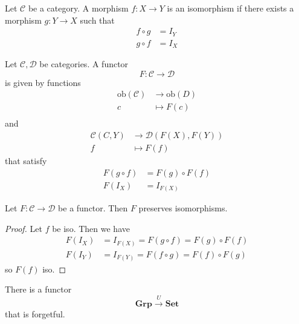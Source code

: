 \begin{definition}[isomorphism]
   Let \( \mathcal{C} \) be a category.
   A morphism \( f: X \to Y \) is an isomorphism
   if there exists a morphism \( g: Y \to  X \) such that
   \begin{align*}
     f \circ g &= I_Y \\
     g \circ f &= I_X
   \end{align*}
\end{definition}

\begin{definition}[functor]
   Let \( \mathcal{C}, \mathcal{D} \) be categories.
   A functor
   \[
    F: \mathcal{C} \to \mathcal{D}
   \]
   is given by functions
   \begin{align*}
     \text{ob}(\mathcal{C}) &\longrightarrow \text{ob}(D) \\
      c &\longmapsto F(c) \\
    \end{align*}
    and
    \begin{align*}
      \mathcal{C}(C, Y) &\longrightarrow \mathcal{D}(F(X), F(Y)) \\
      f &\longmapsto F(f)
    \end{align*}
    that satisfy
    \begin{align*}
      F(g \circ f) &= F(g) \circ F(f) \\
      F(I_X) &= I_{F(X)}
    \end{align*}
\end{definition}

\begin{lemma}
  \label{lma:iso}
    Let \( F: \mathcal{C} \to \mathcal{D} \) be a functor.
    Then \( F \) preserves isomorphisms.
\end{lemma}

\begin{proof}
   Let \( f \) be iso.
   Then we have
   \begin{align*}
     F(I_X) &= I_{F(X)} = F(g \circ f) = F(g) \circ F(f) \\
     F(I_Y) &= I_{F(Y)} = F(f \circ g) = F(f) \circ F(g)
   \end{align*}
   so \( F(f) \) iso.
\end{proof}

\begin{example}
    There is a functor
    \[
      \mathbf{Grp} \xrightarrow{U} \mathbf{Set}
    \]
    that is forgetful.
\end{example}

